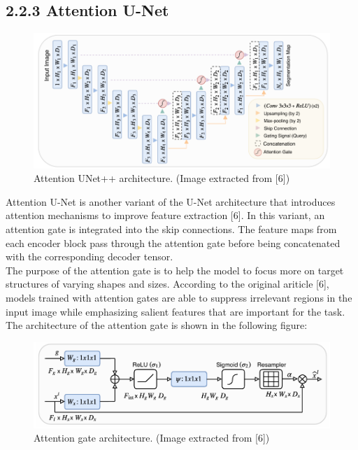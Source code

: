 \subsection{2.2.3 Attention U-Net}
\begin{figure}[H]
 \centering
 \includegraphics[scale=0.6]{IMAGENES/IMG5-AUNet.PNG}
 \captionsetup{font=large}
 \caption {Attention UNet++ architecture. (Image extracted from [6]) }
\end{figure}

Attention U-Net is another variant of the U-Net architecture that introduces attention mechanisms to improve feature extraction [6]. In this variant, an attention gate is integrated into the skip connections. The feature maps from each encoder block pass through the attention gate before being concatenated with the corresponding decoder tensor.\\

The purpose of the attention gate is to help the model to focus more on target structures of varying shapes and sizes. According to the original ariticle [6], models trained with attention gates are able to suppress irrelevant regions in the input image while emphasizing salient features that are important for the task.\\

The architecture of the attention gate is shown in the following figure: 

\begin{figure}[H]
 \centering
 \includegraphics[scale=0.6]{IMAGENES/IMG6-AttentionGate.PNG}
 \captionsetup{font=large}
 \caption {Attention gate architecture. (Image extracted from [6]) }
\end{figure}

